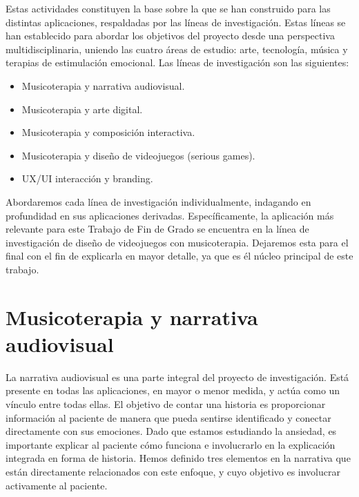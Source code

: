 Estas actividades constituyen la base sobre la que se han construido para las distintas aplicaciones, respaldadas por las líneas de investigación. Estas líneas se han establecido para abordar los objetivos del proyecto desde una perspectiva multidisciplinaria, uniendo las cuatro áreas de estudio: arte, tecnología, música y terapias de estimulación emocional. Las líneas de investigación son las siguientes:

\begin{itemize}
	\item Musicoterapia y narrativa audiovisual.
	\item Musicoterapia y arte digital.
	\item Musicoterapia y composición interactiva.
	\item Musicoterapia y diseño de videojuegos (serious games).
	\item UX/UI interacción y branding.
\end{itemize}

Abordaremos cada línea de investigación individualmente, indagando en profundidad en sus aplicaciones derivadas. Específicamente, la aplicación más relevante para este Trabajo de Fin de Grado se encuentra en la línea de investigación de diseño de videojuegos con musicoterapia. Dejaremos esta para el final con el fin de explicarla en mayor detalle, ya que es él núcleo principal de este trabajo.

\section{Musicoterapia y narrativa audiovisual}

La narrativa audiovisual es una parte integral del proyecto de investigación. Está presente en todas las aplicaciones, en mayor o menor medida, y actúa como un vínculo entre todas ellas. El objetivo de contar una historia es proporcionar información al paciente de manera que pueda sentirse identificado y conectar directamente con sus emociones. Dado que estamos estudiando la ansiedad, es importante explicar al paciente cómo funciona e involucrarlo en la explicación integrada en forma de historia. Hemos definido tres elementos en la narrativa que están directamente relacionados con este enfoque, y cuyo objetivo es involucrar activamente al paciente.

